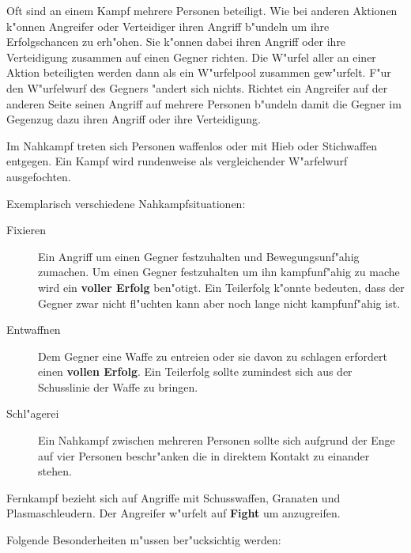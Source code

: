 Oft sind an einem Kampf mehrere Personen beteiligt. Wie bei anderen Aktionen k"onnen Angreifer oder Verteidiger ihren Angriff b"undeln um ihre Erfolgschancen zu erh"ohen. Sie k"onnen dabei ihren Angriff oder ihre Verteidigung zusammen auf einen Gegner richten. Die W"urfel aller an einer Aktion beteiligten werden dann als ein W"urfelpool zusammen gew"urfelt. F"ur den W"urfelwurf des Gegners "andert sich nichts. Richtet ein Angreifer auf der anderen Seite seinen Angriff auf mehrere Personen b"undeln damit die Gegner im Gegenzug dazu ihren Angriff oder ihre Verteidigung.

Im Nahkampf treten sich Personen waffenlos oder mit Hieb oder Stichwaffen entgegen. Ein Kampf wird rundenweise als vergleichender W"arfelwurf ausgefochten.

Exemplarisch verschiedene Nahkampfsituationen:

\begin{description}
    \item[Fixieren] Ein Angriff um einen Gegner festzuhalten und Bewegungsunf"ahig zumachen. Um einen Gegner festzuhalten um ihn    
        kampfunf"ahig zu mache wird ein \textbf{voller Erfolg} ben"otigt. Ein Teilerfolg k"onnte bedeuten, dass der Gegner zwar nicht fl"uchten kann aber noch lange nicht kampfunf"ahig ist.
    \item[Entwaffnen] Dem Gegner eine Waffe zu entrei\3en oder sie davon zu schlagen erfordert einen \textbf{vollen Erfolg}. Ein Teilerfolg 
        sollte zumindest sich aus der Schusslinie der Waffe zu bringen.
    \item[Schl"agerei] Ein Nahkampf zwischen mehreren Personen sollte sich aufgrund der Enge auf vier Personen beschr"anken die in direktem 
        Kontakt zu einander stehen.
\end{description}


Fernkampf bezieht sich auf Angriffe mit Schusswaffen, Granaten und Plasmaschleudern. Der Angreifer w"urfelt auf \textbf{Fight} um anzugreifen.

Folgende Besonderheiten m"ussen ber"ucksichtig werden:

